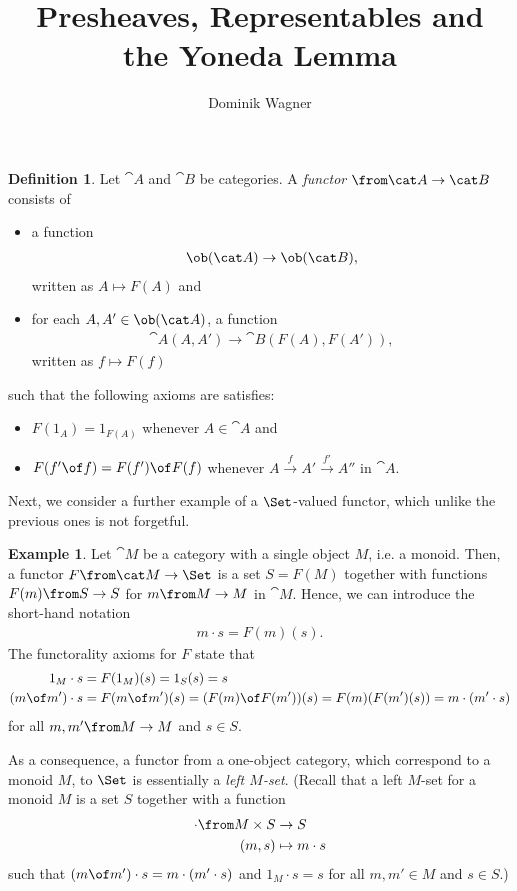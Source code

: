 \documentclass{article}
\title{Presheaves, Representables and\\the Yoneda Lemma}
\author{Dominik Wagner}
\theoremstyle{definition}
\newtheorem{definition}{Definition}
\newtheorem{example}{Example}
\begin{document}
\begin{definition}
  Let $\cat A$ and $\cat B$ be categories. A \emph{functor} $\from \cat A\to\cat B$ consists of
    \begin{itemize}
    \item a function
      \begin{align*}
        \ob(\cat A)\to\ob(\cat B),
      \end{align*}
      written as $A\mapsto F(A)$ and
    \item for each $A,A'\in\ob(\cat A)$, a function
      \begin{align*}
        \cat A(A,A')\to\cat B(F(A),F(A')),
      \end{align*}
      written as $f\mapsto F(f)$
    \end{itemize}
    such that the following axioms are satisfies:
    \begin{itemize}
    \item $F(1_A)=1_{F(A)}$ whenever $A\in\cat A$ and
    \item $F(f'\of f)=F(f')\of F(f)$ whenever $A\xrightarrow{f}A'\xrightarrow{f'}A''$ in $\cat A$.
    \end{itemize}
\end{definition}

Next, we consider a further example of a $\Set$-valued functor, which unlike the previous ones is not forgetful.
\begin{example}
  \label{ex:Mset}
  Let $\cat M$ be a category with a single object $M$, i.e. a monoid. Then, a functor $F\from\cat M\to\Set$ is a set $S=F(M)$ together with functions $F(m)\from S\to S$ for $m\from M\to M$ in $\cat M$. Hence, we can introduce the short-hand notation
  \begin{align*}
    m\cdot s=F(m)(s).
  \end{align*}
  The functorality axioms for $F$ state that
  \begin{align*}
    1_M\cdot s&=F(1_M)(s)=1_S(s)=s\\
    (m\of m')\cdot s&=F(m\of m')(s)=(F(m)\of F(m'))(s)=F(m)(F(m')(s))=m\cdot (m'\cdot s)
  \end{align*}
  for all $m,m'\from M\to M$ and $s\in S$. 

  As a consequence, a functor from a one-object category, which correspond to a monoid $M$, to $\Set$ is essentially a \emph{left $M$-set}. (Recall that a left $M$-set for a monoid $M$ is a set $S$ together with a function
  \begin{align*}
    \cdot\from M\times S&\to S\\
    (m,s)&\mapsto m\cdot s
  \end{align*}
  such that $(m\of m')\cdot s=m\cdot (m'\cdot s)$ and $1_M\cdot s=s$ for all $m,m'\in M$ and $s\in S$.)  
\end{example}
\end{document}
